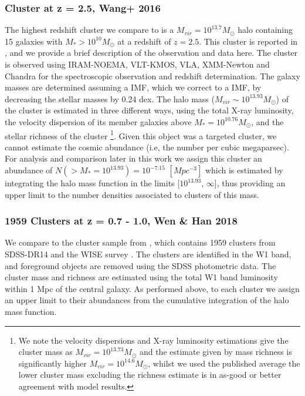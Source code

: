 \label{subsec:Clusters}
\subsubsection{Cluster at z = 2.5, Wang+ 2016}
\label{subsubsec:Wang}
The highest redshift cluster we compare to is a $M_{vir} = 10^{13.7} M_{\odot}$ halo containing 15 galaxies with $M_* > 10^{10} M_{\odot}$ at a redshift of $z = 2.5$.
This cluster is reported in \citet{Wang2016DISCOVERY2.506}, and we provide a brief description of the observation and data here.
The cluster is observed using IRAM-NOEMA, VLT-KMOS, VLA, XMM-Newton and Chandra for the spectroscopic observation and redshift determination.  
The galaxy masses are determined assuming a \citet{Salpeter1955TheEvolution.} IMF, which we correct to a \citet{Chabrier2003GalacticFunction} IMF, by decreasing the stellar masses by 0.24 dex.
The halo mass ($M_{vir} \sim 10^{13.93} M_{\odot}$) of the cluster is estimated in three different ways, using the total X-ray luminosity, the velocity dispersion of its member galaxies above $M_* = 10^{10.76} M_{\odot}$, and the stellar richness of the cluster \footnote{We note the velocity dispersions and X-ray luminosity estimations give the cluster mass as $M_{vir} = 10^{13.73} M_{\odot}$ and the estimate given by mass richness is significantly higher $M_{vir} = 10^{14.6} M_{\odot}$, whilst we used the published average the lower cluster mass excluding the richness estimate is in as-good or better agreement with model results.}. Given this object was a targeted cluster, we cannot estimate the cosmic abundance (i.e, the number per cubic megaparsec). For analysis and comparison later in this work we assign this cluster an abundance of $N(> M_*=10^{13.93})=10^{-7.15}$ $[Mpc^{-3}]$ which is estimated by integrating the halo mass function in the limits [$10^{13.93}$, $\infty$], thus providing an upper limit to the number densities associated to clusters of this mass. 

\subsubsection{1959 Clusters at z = 0.7 - 1.0, Wen \& Han 2018}
\label{subsubsec:1959}
We compare to the cluster sample from \citet{Wen2018ARedshifts}, which contains 1959 clusters from SDSS-DR14 \citep{Abolfathi2017TheExperiment} and the WISE survey \citep{Wright2010THEPERFORMANCE}. The clusters are identified in the W1 band, and foreground objects are removed using the SDSS photometric data. The cluster mass and richness are estimated using the total W1 band luminosity within 1 Mpc of the central galaxy. As performed above, to each cluster we assign an upper limit to their abundances from the cumulative integration of the halo mass function.

